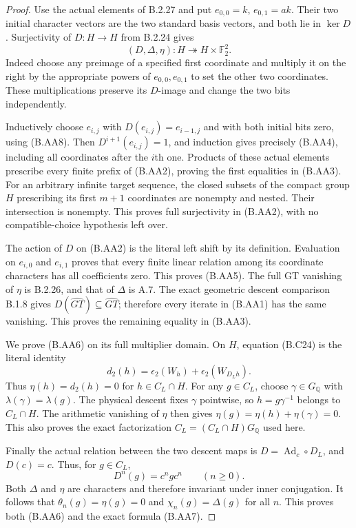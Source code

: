 \begin{proof}
Use the actual elements of B.2.27 and put
$e_{0,0}=k$, $e_{0,1}=ak$.  Their two initial
character vectors are the two standard basis
vectors, and both lie in $\ker D$.
Surjectivity of $D:H\to H$ from B.2.24 gives
\[
 (D,\Delta,\eta):H\twoheadrightarrow H\times\mathbb F_2^2.
 \tag{B.AA8}
\]
Indeed choose any preimage of a specified first
coordinate and multiply it on the right by the
appropriate powers of $e_{0,0},e_{0,1}$ to set
the other two coordinates.  These multiplications
preserve its $D$-image and change the two bits
independently.

Inductively choose $e_{i,j}$ with
$D(e_{i,j})=e_{i-1,j}$ and with both initial
bits zero, using (B.AA8).  Then
$D^{i+1}(e_{i,j})=1$, and induction gives
precisely (B.AA4), including all coordinates
after the $i$th one.  Products of these actual
elements prescribe every finite prefix of
(B.AA2), proving the first equalities in (B.AA3).
For an arbitrary infinite target sequence,
the closed subsets of the compact group $H$
prescribing its first $m+1$ coordinates are
nonempty and nested.  Their intersection is
nonempty.  This proves full surjectivity in
(B.AA2), with no compatible-choice hypothesis
left over.

The action of $D$ on (B.AA2) is the literal
left shift by its definition.  Evaluation on
$e_{i,0}$ and $e_{i,1}$ proves that every finite
linear relation among its coordinate characters
has all coefficients zero.  This proves
(B.AA5).  The full GT vanishing of $\eta$ is
B.2.26, and that of $\Delta$ is A.7.
The exact geometric descent comparison B.1.8
gives $D(\widehat{GT})\subseteq\widehat{GT}$;
therefore every iterate in (B.AA1) has the
same vanishing.  This proves the remaining
equality in (B.AA3).

We prove (B.AA6) on its full multiplier domain.
On $H$, equation (B.C24) is the literal identity
\[
 d_2(h)=\epsilon_2(W_h)+
                         \epsilon_2(W_{D_Lh}).
 \tag{B.AA9}
\]
Thus $\eta(h)=d_2(h)=0$ for
$h\in C_L\cap H$.  For any $g\in C_L$,
choose $\gamma\in G_{\mathbb Q}$ with
$\lambda(\gamma)=\lambda(g)$.
The physical descent fixes $\gamma$ pointwise,
so $h=g\gamma^{-1}$ belongs to $C_L\cap H$.
The arithmetic vanishing of $\eta$ then gives
$\eta(g)=\eta(h)+\eta(\gamma)=0$.
This also proves the exact factorization
$C_L=(C_L\cap H)G_{\mathbb Q}$ used here.

Finally the actual relation between the two
descent maps is $D=\operatorname{Ad}_c\circ D_L$,
and $D(c)=c$.  Thus, for $g\in C_L$,
\[
                    D^n(g)=c^n g c^n\qquad(n\geq0).
 \tag{B.AA10}
\]
Both $\Delta$ and $\eta$ are characters and
therefore invariant under inner conjugation.
It follows that $\theta_n(g)=\eta(g)=0$ and
$\chi_n(g)=\Delta(g)$ for all $n$.
This proves both (B.AA6) and the exact formula
(B.AA7).


\end{proof}
